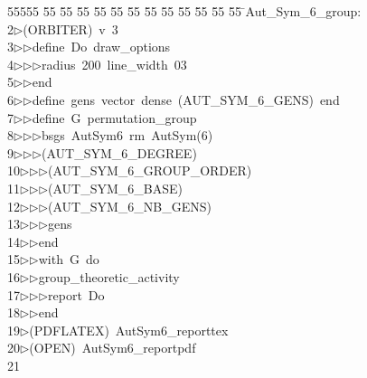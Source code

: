 %
%
\begin{tabbing}
55555 \= 55 \= 55 \= 55 \= 55 \= 55 \= 55 \= 55 \= 55 \= 55 \= 55 \= 55 \= 55 \= \>Aut\_Sym\_6\_group:\\[0pt]
2\>$\triangleright$\>(ORBITER)\ v\ 3\ \\[0pt]
3\>$\triangleright$\>$\triangleright$\>define\ Do\ draw\_options\ \\[0pt]
4\>$\triangleright$\>$\triangleright$\>$\triangleright$\>radius\ 200\ line\_width\ 03\ \\[0pt]
5\>$\triangleright$\>$\triangleright$\>end\ \\[0pt]
6\>$\triangleright$\>$\triangleright$\>define\ gens\ vector\ dense\ (AUT\_SYM\_6\_GENS)\ end\ \\[0pt]
7\>$\triangleright$\>$\triangleright$\>define\ G\ permutation\_group\ \\[0pt]
8\>$\triangleright$\>$\triangleright$\>$\triangleright$\>bsgs\ AutSym6\ rm\ AutSym(6)\ \\[0pt]
9\>$\triangleright$\>$\triangleright$\>$\triangleright$\>(AUT\_SYM\_6\_DEGREE)\ \\[0pt]
10\>$\triangleright$\>$\triangleright$\>$\triangleright$\>(AUT\_SYM\_6\_GROUP\_ORDER)\ \\[0pt]
11\>$\triangleright$\>$\triangleright$\>$\triangleright$\>(AUT\_SYM\_6\_BASE)\ \\[0pt]
12\>$\triangleright$\>$\triangleright$\>$\triangleright$\>(AUT\_SYM\_6\_NB\_GENS)\ \\[0pt]
13\>$\triangleright$\>$\triangleright$\>$\triangleright$\>gens\ \\[0pt]
14\>$\triangleright$\>$\triangleright$\>end\ \\[0pt]
15\>$\triangleright$\>$\triangleright$\>with\ G\ do\ \\[0pt]
16\>$\triangleright$\>$\triangleright$\>group\_theoretic\_activity\ \\[0pt]
17\>$\triangleright$\>$\triangleright$\>$\triangleright$\>report\ Do\ \\[0pt]
18\>$\triangleright$\>$\triangleright$\>end\\[0pt]
19\>$\triangleright$\>(PDFLATEX)\ AutSym6\_reporttex\\[0pt]
20\>$\triangleright$\>(OPEN)\ AutSym6\_reportpdf\\[0pt]
21\>\end{tabbing}
